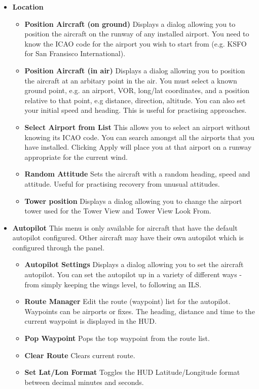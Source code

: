 \begin{itemize}
\item \textbf{Location}
 \begin{itemize}
   \item \textbf{Position Aircraft (on ground)}  Displays a dialog allowing you
to position the aircraft 
   on the runway of any installed airport. You need to know the ICAO code for
the airport you wish to 
   start from (e.g. KSFO for San Fransisco International). 
   \item \textbf{Position Aircraft (in air)} Displays a dialog allowing you to
position the aircraft at 
   an arbitary point in the air. You must select a known ground point, e.g. an
airport, VOR, long/lat 
   coordinates, and a position relative to that point, e.g distance, direction,
altitude. You can also 
   set your initial speed and heading. This is useful for practising approaches.
   \item \textbf{Select Airport from List} This allows you to select an airport
without knowing its ICAO 
   code. You can search amongst all the airports that you have installed.
Clicking Apply will place you at that airport on a runway appropriate for the current wind.
   \item \textbf{Random Attitude} Sets the aircraft with a random heading, speed
and attitude. Useful for practising recovery from unusual attitudes.
   \item \textbf{Tower position} Displays a dialog allowing you to change the
airport tower used for 
   the Tower View and Tower View Look From.
 \end{itemize}

\item \textbf{Autopilot} This menu is only available for
aircraft that have the default 
autopilot configured. Other aircraft may have their own autopilot which is
configured through the panel.
 \begin{itemize}

   \item \textbf{Autopilot Settings} Displays a dialog allowing you to set the
aircraft autopilot. 
   You can set the autopilot up in a variety of different ways - from simply
keeping the wings level, 
   to following an ILS.
  \item \textbf{Route Manager} Edit the route (waypoint) list for the autopilot.
Waypoints can be airports or fixes. The heading, distance and time to the
current waypoint is displayed in the HUD.
  \item \textbf{Pop Waypoint} Pops the top waypoint from the route list.
 \item \textbf{Clear Route} Clears current route.
  \item \textbf{Set Lat/Lon Format} Toggles the HUD Latitude/Longitude format
between decimal minutes and seconds.
 \end{itemize}
 

\end{itemize}
